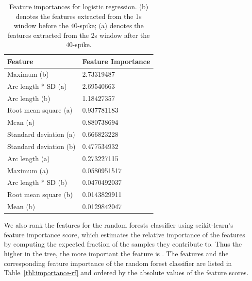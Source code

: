\documentclass{soups}
\begin{document}
\begin{table}[t]
\centering
\begin{tabular}{@{}ll@{}}
\toprule
Feature                & Feature Importance \\ \midrule
Maximum (b)            & 2.73319487        \\
Arc length * SD (a)    & 2.69540663        \\
Arc length (b)         & 1.18427357        \\
Root mean square (a)   & 0.937781183       \\
Mean (a)               & 0.880738694      \\
Standard deviation (a) & 0.666823228      \\
Standard deviation (b) & 0.477534932      \\
Arc length (a)         & 0.273227115      \\
Maximum (a)            & 0.0580951517     \\
Arc length * SD (b)    & 0.0470492037      \\
Root mean square (b)   & 0.0143829911      \\
Mean (b)               & 0.0129842047     \\ \bottomrule
\end{tabular}
\caption{Feature importances for logistic regression. (b) denotes the features extracted from the 1s window before the 40-spike; (a) denotes the features extracted from the 2s window after the 40-spike.}
\label{tbl:importance-lr}
\end{table}

We also rank the features for the random forests classifier using scikit-learn's feature importance score, which estimates the relative importance of the features by computing the expected fraction of the samples they contribute to. 
Thus the higher in the tree, the more important the feature is \cite{sklearn:rfdoc}. 
The features and the corresponding feature importance of the random forest classifier are listed in Table~\ref{tbl:importance-rf} and ordered by the absolute values of the feature scores. 

\end{document}
